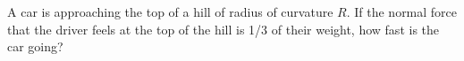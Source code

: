 A car is approaching the top of a hill of radius of curvature $R$. If
the normal force that the driver feels at the top of the hill is 1/3
of their weight, how fast is the car going?
